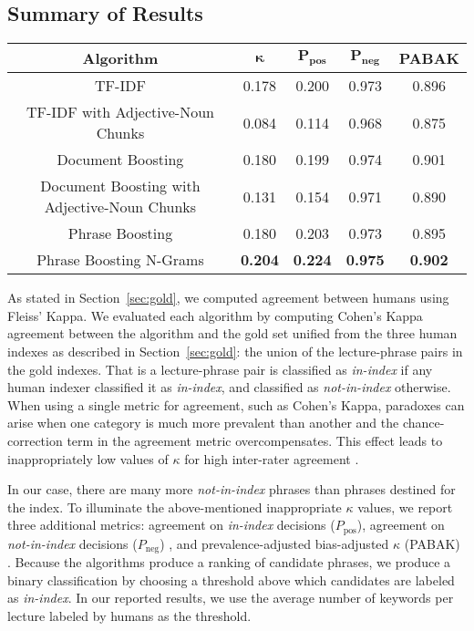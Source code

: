 \subsection{Summary of Results}
\label{sec:sum}



\begin{figure*}[!ht]
\caption{}
\label{fig:main_result}
\begin{tabular}{|c|c|c|c|c|}
\hline
\textbf{Algorithm} & $\mathbf{\kappa}$ & $\mathbf{P_{\text{pos}}}$ & $\mathbf{P_{\text{neg}}}$ & \textbf{PABAK} \\
\hline
TF-IDF & 0.178 & 0.200 & 0.973 & 0.896 \\
\hline
TF-IDF with Adjective-Noun Chunks & 0.084 & 0.114 & 0.968 & 0.875 \\
\hline
Document Boosting & 0.180 & 0.199 & 0.974 & 0.901 \\
\hline
Document Boosting with Adjective-Noun Chunks & 0.131 & 0.154 & 0.971 & 0.890 \\
\hline
Phrase Boosting & 0.180 & 0.203 & 0.973 & 0.895 \\
\hline
Phrase Boosting N-Grams & \textbf{0.204} & \textbf{0.224} & \textbf{0.975} & \textbf{0.902} \\
\hline
\end{tabular}
\end{figure*}

As stated in Section~\ref{sec:gold}, we computed agreement between
humans using Fleiss' Kappa. We evaluated each algorithm by computing
Cohen's Kappa agreement between the algorithm and the gold set
unified from the three human indexes as described in
Section~\ref{sec:gold}: the union of the lecture-phrase pairs in the
gold indexes. That is a lecture-phrase pair is classified as {\em
  in-index} if any human indexer classified it as {\em in-index}, and
classified as {\em not-in-index} otherwise. When using a single metric
for agreement, such as Cohen's Kappa, paradoxes can arise when one
category is much more prevalent than another and the chance-correction
term in the agreement metric overcompensates. This effect leads to
inappropriately low values of $\kappa$ for high inter-rater agreement
\cite{feinstein1990high}.

In our case, there are many more {\em not-in-index} phrases than
phrases destined for the index. To illuminate the above-mentioned
inappropriate $\kappa$ values, we report three additional metrics:
agreement on {\em in-index} decisions ($P_{\text{pos}}$), agreement on
{\em not-in-index} decisions ($P_{\text{neg}}$)
\cite{cicchetti1990high}, and prevalence-adjusted bias-adjusted
$\kappa$ (PABAK) \cite{byrt1993bias}. Because the algorithms produce a
ranking of candidate phrases, we produce a binary classification by
choosing a threshold above which candidates are labeled as {\em
  in-index}. In our reported results, we use the average number of
keywords per lecture labeled by humans as the threshold.

